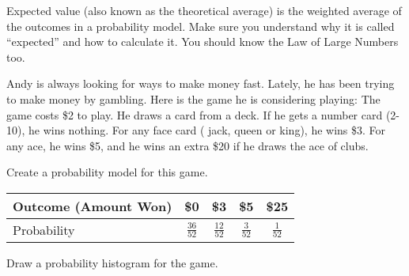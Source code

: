 \documentclass[12pt]{exam}
\newcounter{countA}
\begin{document}
Expected value (also known as the theoretical average) is the weighted
average of the outcomes in a probability model. Make sure you understand
why it is called ``expected'' and how to calculate it. You should know
the Law of Large Numbers too.

\begin{questions}
\setcounter{question}{\value{countA}}

\item
  Andy is always looking for ways to make money fast. Lately, he has
  been trying to make money by gambling. Here is the game he is
  considering playing: The game costs \$2 to play. He draws a card from
  a deck. If he gets a number card (2-10), he wins nothing. For any face
  card ( jack, queen or king), he wins \$3. For any ace, he wins \$5,
  and he wins an extra \$20 if he draws the ace of clubs.

  \begin{parts}
  \item
    Create a probability model for this game.
\begin{solution}
\begin{center}
  \renewcommand{\arraystretch}{1.5}
\begin{tabular}{l|c|c|c|c}
Outcome (Amount Won) & \$0 & \$3 & \$5 & \$25 \\ \hline
Probability & $\frac{36}{52}$ & $\frac{12}{52}$ & $\frac{3}{52}$ & $\frac{1}{52}$
\end{tabular}
\end{center}
\end{solution}
\vfill
  \item
    Draw a probability histogram for the game.
\begin{solution}
\begin{center}


\end{center}
\end{solution}
\end{parts}
\end{questions}
\end{document}
